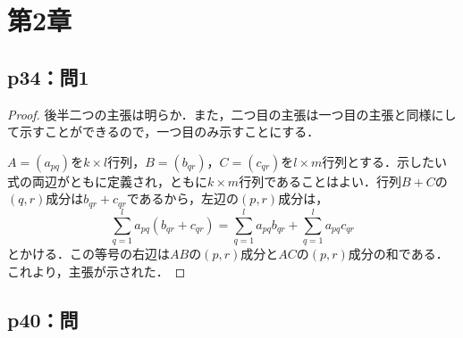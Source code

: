 \documentclass[uplatex,dvipdfmx,a4paper,10pt,fleqn]{jsarticle}
\begin{document}
\section*{第2章}


\subsection*{p34：問1}

\begin{tleftbar}
\begin{proof}
後半二つの主張は明らか．また，二つ目の主張は一つ目の主張と同様にして示すことができるので，一つ目のみ示すことにする．


$A=(a_{pq})$を$k \times l$行列，$B= (b_{qr})$，$C=(c_{qr})$を$l \times m$行列とする．示したい式の両辺がともに定義され，ともに$k \times m$行列であることはよい．行列$B+C$の$(q,r)$成分は$b_{qr}+c_{qr}$であるから，左辺の$(p,r)$成分は，
\[
\sum_{q=1}^{l}a_{pq}\left(b_{qr}+c_{qr}\right)=\sum_{q=1}^{l}a_{pq}b_{qr}+\sum_{q=1}^{l}a_{pq}c_{qr}
\]
とかける．この等号の右辺は$AB$の$(p,r)$成分と$AC$の$(p,r)$成分の和である．これより，主張が示された．
\end{proof}
\end{tleftbar}



\subsection*{p40：問}
\end{document}
